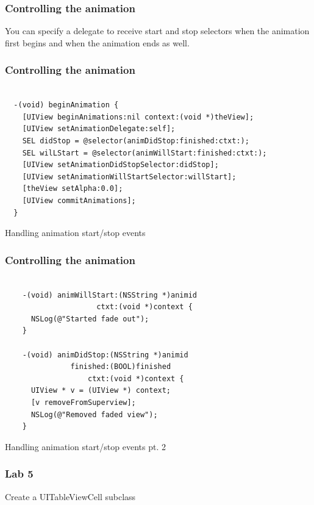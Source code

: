 \documentclass[10pt]{beamer}
\begin{document}
\begin{frame}[fragile]
  \frametitle{Controlling the animation}
  You can specify a delegate to receive start and stop selectors when the animation first begins and when the animation ends as well.

\end{frame}

\begin{frame}[fragile]
  \frametitle{Controlling the animation}
  \begin{listing}[H]
    \begin{verbatim}

  -(void) beginAnimation {
    [UIView beginAnimations:nil context:(void *)theView];
    [UIView setAnimationDelegate:self];
    SEL didStop = @selector(animDidStop:finished:ctxt:);
    SEL wilLStart = @selector(animWillStart:finished:ctxt:);
    [UIView setAnimationDidStopSelector:didStop];
    [UIView setAnimationWillStartSelector:willStart];
    [theView setAlpha:0.0];
    [UIView commitAnimations];
  }

  \end{verbatim}
    \caption{Handling animation start/stop events}
    \label{listing:37}
  \end{listing}

\end{frame}

\begin{frame}[fragile]
  \frametitle{Controlling the animation}
  \begin{listing}[H]
      \begin{verbatim}

    -(void) animWillStart:(NSString *)animid
                     ctxt:(void *)context {
      NSLog(@"Started fade out");
    }

    -(void) animDidStop:(NSString *)animid
               finished:(BOOL)finished
                   ctxt:(void *)context {
      UIView * v = (UIView *) context;
      [v removeFromSuperview];
      NSLog(@"Removed faded view");
    }                          

    \end{verbatim}
      \caption{Handling animation start/stop events pt. 2}
      \label{listing:38}
    \end{listing}

\end{frame}

    
\begin{frame}[fragile]
  \frametitle{Lab 5}
  Create a UITableViewCell subclass

\end{frame}
\end{document}
